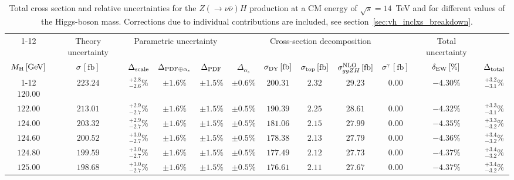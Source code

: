 \begin{landscape}
\begin{table}[ht!]
\caption{Total cross section and relative uncertainties for the $Z ( \rightarrow 
\nu \bar{\nu}) H$ production at a CM energy of  $\sqrt{s}=14$~TeV and for different values of the Higgs-boson mass. Corrections due to individual contributions are included, see section~\ref{sec:vh_inclxs_breakdown}.}
\label{tab:zh_nu_xs_14tev}
\centering
\scriptsize
{\renewcommand{\arraystretch}{1.4}
\begin{tabular}{| cc | c | ccc | ccccc | c |}
\cline{1-12}
\multicolumn{2}{|c|}{\(\sqrt{s} = 14\,\mathrm{TeV}\)} &
\multicolumn{1}{|c|}{Theory uncertainty} &
\multicolumn{3}{|c|}{Parametric uncertainty} &
\multicolumn{5}{|c|}{Cross-section decomposition} &
\multicolumn{1}{c|}{Total uncertainty} \\
\(M_\mathrm{H}\,[\mathrm{GeV}]\) & \(\sigma\,[\mathrm{fb}]\) &
\(\Delta_{\rm scale}\) &
\(\Delta_{\rm PDF\oplus\alpha_s}\) &
{\color{black!55}\(\Delta_{\rm PDF}\)} & {\color{black!55}\(\Delta_{\alpha_s}\)} &
\(\sigma_{\rm DY}\,[\mathrm{fb}]\) & \(\sigma_{\rm top}\,[\mathrm{fb}]\) & \(\sigma^{\rm NLO}_{ggZH}\,[\mathrm{fb}]\) & \(\sigma^\gamma\,[\mathrm{fb}]\) & \(\delta_{\rm EW}\,[\%]\) &
\(\Delta_{\rm total}\)
\\
\cline{1-12}
$120.00$ & $223.24$ & $^{+2.8}_{-2.6}\%$ & $\pm 1.6\%$ & {\color{black!55}$\pm 1.5\%$} & {\color{black!55}$\pm 0.6\%$} & $200.31$ & $2.32$ & $29.23$ & $0.00$ & $-4.30\%$ & $^{+3.2}_{-3.1}\%$ \\
$122.00$ & $213.01$ & $^{+2.9}_{-2.7}\%$ & $\pm 1.6\%$ & {\color{black!55}$\pm 1.5\%$} & {\color{black!55}$\pm 0.5\%$} & $190.39$ & $2.25$ & $28.61$ & $0.00$ & $-4.32\%$ & $^{+3.3}_{-3.1}\%$ \\
$124.00$ & $203.32$ & $^{+2.9}_{-2.7}\%$ & $\pm 1.6\%$ & {\color{black!55}$\pm 1.5\%$} & {\color{black!55}$\pm 0.5\%$} & $181.06$ & $2.15$ & $27.99$ & $0.00$ & $-4.35\%$ & $^{+3.3}_{-3.2}\%$ \\
$124.60$ & $200.52$ & $^{+3.0}_{-2.7}\%$ & $\pm 1.6\%$ & {\color{black!55}$\pm 1.5\%$} & {\color{black!55}$\pm 0.5\%$} & $178.38$ & $2.13$ & $27.79$ & $0.00$ & $-4.36\%$ & $^{+3.4}_{-3.2}\%$ \\
$124.80$ & $199.59$ & $^{+3.0}_{-2.7}\%$ & $\pm 1.6\%$ & {\color{black!55}$\pm 1.5\%$} & {\color{black!55}$\pm 0.5\%$} & $177.49$ & $2.12$ & $27.73$ & $0.00$ & $-4.37\%$ & $^{+3.4}_{-3.2}\%$ \\
$125.00$ & $198.68$ & $^{+3.0}_{-2.7}\%$ & $\pm 1.6\%$ & {\color{black!55}$\pm 1.5\%$} & {\color{black!55}$\pm 0.5\%$} & $176.61$ & $2.11$ & $27.67$ & $0.00$ & $-4.37\%$ & $^{+3.4}_{-3.2}\%$ \\

\end{tabular}}
\end{table}
\end{landscape}
